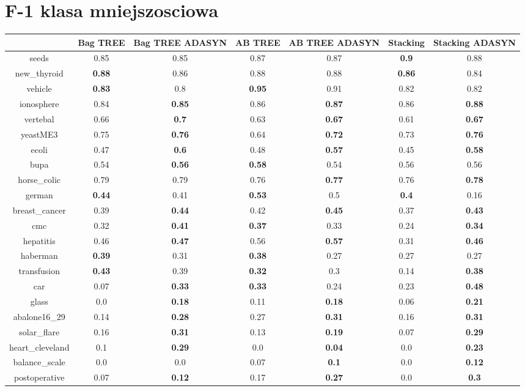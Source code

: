 \documentclass{article}%
\begin{document}
%
\section*{F{-}1 klasa mniejszosciowa}%
\begin{tabular}{c|cccccc}%
&Bag TREE&Bag TREE ADASYN&AB TREE&AB TREE ADASYN&Stacking&Stacking ADASYN\\%
\hline%
seeds&0.85&0.85&0.87&0.87&\textbf{0.9}&0.88\\%
new\_thyroid&\textbf{0.88}&0.86&0.88&0.88&\textbf{0.86}&0.84\\%
vehicle&\textbf{0.83}&0.8&\textbf{0.95}&0.91&0.82&0.82\\%
ionosphere&0.84&\textbf{0.85}&0.86&\textbf{0.87}&0.86&\textbf{0.88}\\%
vertebal&0.66&\textbf{0.7}&0.63&\textbf{0.67}&0.61&\textbf{0.67}\\%
yeastME3&0.75&\textbf{0.76}&0.64&\textbf{0.72}&0.73&\textbf{0.76}\\%
ecoli&0.47&\textbf{0.6}&0.48&\textbf{0.57}&0.45&\textbf{0.58}\\%
bupa&0.54&\textbf{0.56}&\textbf{0.58}&0.54&0.56&0.56\\%
horse\_colic&0.79&0.79&0.76&\textbf{0.77}&0.76&\textbf{0.78}\\%
german&\textbf{0.44}&0.41&\textbf{0.53}&0.5&\textbf{0.4}&0.16\\%
breast\_cancer&0.39&\textbf{0.44}&0.42&\textbf{0.45}&0.37&\textbf{0.43}\\%
cmc&0.32&\textbf{0.41}&\textbf{0.37}&0.33&0.24&\textbf{0.34}\\%
hepatitis&0.46&\textbf{0.47}&0.56&\textbf{0.57}&0.31&\textbf{0.46}\\%
haberman&\textbf{0.39}&0.31&\textbf{0.38}&0.27&0.27&0.27\\%
transfusion&\textbf{0.43}&0.39&\textbf{0.32}&0.3&0.14&\textbf{0.38}\\%
car&0.07&\textbf{0.33}&\textbf{0.33}&0.24&0.23&\textbf{0.48}\\%
glass&0.0&\textbf{0.18}&0.11&\textbf{0.18}&0.06&\textbf{0.21}\\%
abalone16\_29&0.14&\textbf{0.28}&0.27&\textbf{0.31}&0.16&\textbf{0.31}\\%
solar\_flare&0.16&\textbf{0.31}&0.13&\textbf{0.19}&0.07&\textbf{0.29}\\%
heart\_cleveland&0.1&\textbf{0.29}&0.0&\textbf{0.04}&0.0&\textbf{0.23}\\%
balance\_scale&0.0&0.0&0.07&\textbf{0.1}&0.0&\textbf{0.12}\\%
postoperative&0.07&\textbf{0.12}&0.17&\textbf{0.27}&0.0&\textbf{0.3}\\%
\end{tabular}
\end{document}
